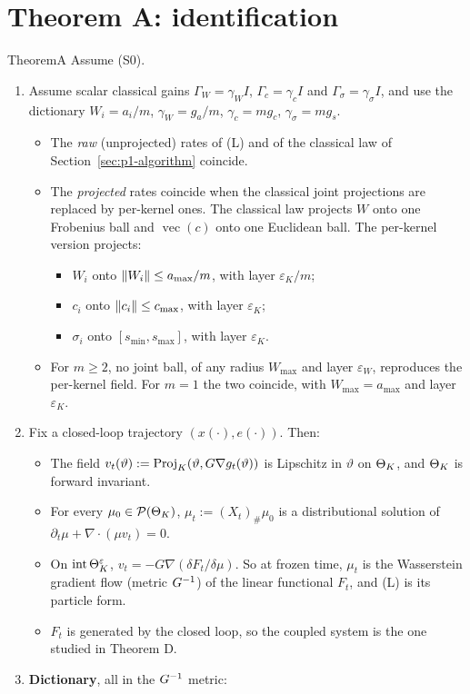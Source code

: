 \section{Theorem A: identification}\label{sec:thmA}

\begin{thm}{Theorem}{A}
Assume \textup{(S0)}.
\begin{enumerate}[label=(\roman*)]
  \item Assume scalar classical gains $\Gamma_W = \gamma_W I$, $\Gamma_c = \gamma_c I$ and
    $\Gamma_\sigma = \gamma_\sigma I$, and use the dictionary $W_i = a_i/m$, $\gamma_W = g_a/m$, $\gamma_c = m g_c$,
    $\gamma_\sigma = m g_s$.
    \begin{itemize}
      \item The \emph{raw} \textup{(}unprojected\textup{)} rates of \textup{(L)} and of the classical law of
        Section~\ref{sec:p1-algorithm} coincide.
      \item The \emph{projected} rates coincide when the classical joint projections are replaced by per-kernel
        ones. The classical law projects $W$ onto one Frobenius ball and $\operatorname{vec}(c)$ onto one Euclidean
        ball. The per-kernel version projects:
        \begin{itemize}
          \item $W_i$ onto $\lVert W_i\rVert\le a_{\max}/m$, with layer $\varepsilon_K/m$;
          \item $c_i$ onto $\lVert c_i\rVert\le c_{\max}$, with layer $\varepsilon_K$;
          \item $\sigma_i$ onto $[s_{\min},s_{\max}]$, with layer $\varepsilon_K$.
        \end{itemize}
      \item For $m\ge 2$, no joint ball, of any radius $W_{\max}$ and layer $\varepsilon_W$, reproduces the
        per-kernel field. For $m = 1$ the two coincide, with $W_{\max} = a_{\max}$ and layer $\varepsilon_K$.
    \end{itemize}
  \item Fix a closed-loop trajectory $(x(\cdot),e(\cdot))$. Then:
    \begin{itemize}
      \item The field $v_t(\vartheta) := \operatorname{Proj}_K(\vartheta, G\nabla g_t(\vartheta))$ is Lipschitz in $\vartheta$ on
        $\Theta_K$, and $\Theta_K$ is forward invariant.
      \item For every $\mu_0\in\mathcal{P}(\Theta_K)$, $\mu_t := (X_t)_\#\mu_0$ is a distributional solution of
        $\partial_t\mu + \nabla\cdot(\mu v_t) = 0$.
      \item On $\operatorname{int}\Theta_K^{\varepsilon}$, $v_t = -G\nabla(\delta F_t/\delta\mu)$. So at frozen time, $\mu_t$ is the
        Wasserstein gradient flow \textup{(}metric $G^{-1}$\textup{)} of the linear functional $F_t$, and
        \textup{(L)} is its particle form.
      \item $F_t$ is generated by the closed loop, so the coupled system is the one studied in Theorem D.
    \end{itemize}
  \item \textbf{Dictionary}, all in the $G^{-1}$ metric:


\end{enumerate}
\end{thm}
